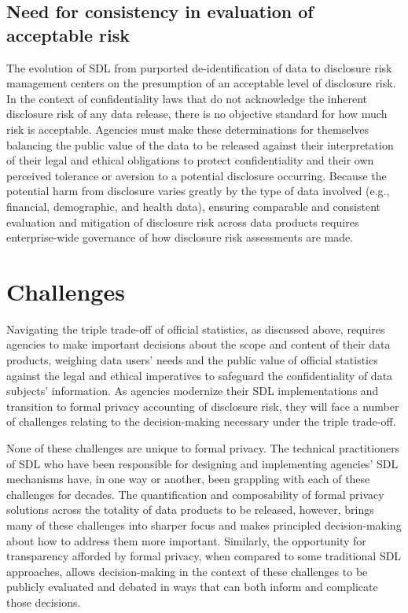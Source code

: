 \subsection{Need for consistency in evaluation of acceptable risk}
The evolution of SDL from purported de-identification of data to disclosure risk management centers on the presumption of an acceptable level of disclosure risk. In the context of confidentiality laws that do not acknowledge the inherent disclosure risk of any data release, there is no objective standard for how much risk is acceptable. Agencies must make these determinations for themselves balancing the public value of the data to be released against their interpretation of their legal and ethical obligations to protect confidentiality and their own perceived tolerance or aversion to a potential disclosure occurring. Because the potential harm from disclosure varies greatly by the type of data involved (e.g., financial, demographic, and health data), ensuring comparable and consistent evaluation and mitigation of disclosure risk across data products requires enterprise-wide governance of how disclosure risk assessments are made.  

\section{Challenges}
Navigating the triple trade-off of official statistics, as discussed above, requires agencies to make important decisions about the scope and content of their data products, weighing data users' needs and the public value of official statistics against the legal and ethical imperatives to safeguard the confidentiality of data subjects' information. As agencies modernize their SDL implementations and transition to formal privacy accounting of disclosure risk, they will face a number of challenges relating to the decision-making necessary under the triple trade-off.  

None of these challenges are unique to formal privacy. The technical practitioners of SDL who have been responsible for designing and implementing  agencies' SDL mechanisms have, in one way or another, been grappling with each of these challenges for decades. The quantification and composability of formal privacy solutions across the totality of data products to be released, however, brings many of these challenges into sharper focus and makes principled decision-making about how to address them more important. Similarly, the opportunity for transparency afforded by formal privacy, when compared to some traditional SDL approaches, allows decision-making in the context of these challenges to be publicly evaluated and debated in ways that can both inform and complicate those decisions.

